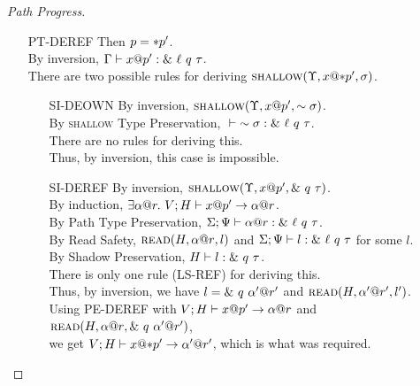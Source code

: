 \begin{proof}[Path Progress]
\begin{itemize}
    \item[PT-DEREF] 
      Then $p = *{p'}$.\\
      By inversion, ${\Gamma} \vdash {{x}@{p'}} : {\&~{{\ell}~{q}~{\tau}}}$.\\
      There are two possible rules for deriving $\textsc{shallow}({\Upsilon},{{x}@{*{p'}}},{\sigma})$.
      \begin{itemize}
	\item[\textsc{SI-DEOWN}]
	  By inversion, $\textsc{shallow}({\Upsilon},{{x}@{p'}},{\sim{\sigma}})$.\\
	  By \textsc{shallow} Type Preservation, ${} \vdash {\sim{\sigma}} : {\&~{{\ell}~{q}~{\tau}}}$.\\
	  There are no rules for deriving this. \\
	  Thus, by inversion, this case is impossible.
	\item[\textsc{SI-DEREF}]
	  By inversion, $\textsc{shallow}({\Upsilon},{{x}@{p'}},{\&~{{q}~{\tau}}})$.\\
	  By induction, $\exists {\alpha}@{r}.~{V;H} \vdash {{x}@{p'}} \to {{\alpha}@{r}}$.\\
	  By Path Type Preservation, ${\Sigma;\Psi} \vdash {{\alpha}@{r}} : {\&~{{\ell}~{q}~{\tau}}}$.\\
	  By Read Safety, $\textsc{read}({H},{{\alpha}@{r}},{l})$ 
	  and ${\Sigma;\Psi} \vdash {l} : {\&~{{\ell}~{q}~{\tau}}}$ for some $l$.\\
	  By Shadow Preservation, ${H} \vdash {l} : {\&~{{q}~{\tau}}}$.\\
	  There is only one rule (\textsc{LS-REF}) for deriving this.\\
	  Thus, by inversion, we have $l = \&~{{q}~{{\alpha'}@{r'}}}$
	  and $\textsc{read}({H},{{\alpha'}@{r'}},{l'})$.\\
	  Using \textsc{PE-DEREF} with 
	  ${V;H} \vdash {{x}@{p'}} \to {{\alpha}@{r}}$ and
	  $\textsc{read}({H},{{\alpha}@{r}},{\&~{{q}~{{\alpha'}@{r'}}}})$,\\
	  we get ${V;H} \vdash {{x}@{*{p'}}} \to {{\alpha'}@{r'}}$,
	  which is what was required.
      \end{itemize}


\end{itemize}
\end{proof}
